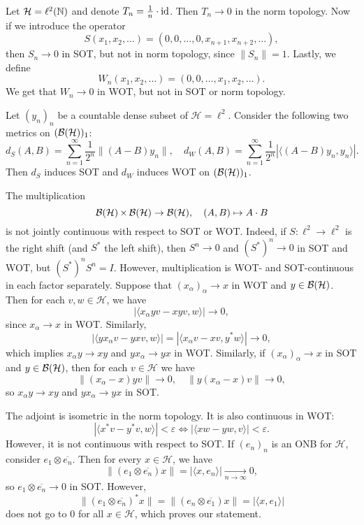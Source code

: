 \begin{example}
  Let $\mathcal{H} = \ell^2 (\mathbb {N})$ and denote $T_n = \frac{1}{n} \cdot \operatorname{id}$.
  Then $T_n \to 0$ in the norm topology. Now if we introduce the operator
  $$S (x_1, x_2, \dots) = (0, 0, \dots, 0, x_{n + 1}, x_{n + 2}, \dots),$$
  then $S_n \to 0$ in SOT, but not in norm topology, since $\|S_n\| = 1$.
  Lastly, we define 
  $$W_n (x_1, x_2, \dots) = (0, 0, \dots, x_1, x_2, \dots).$$
  We get that $W_n \to 0$ in WOT, but not in SOT or norm topology.
\end{example}

\begin{example}
  Let $(y_n)_n$ be a countable dense subset of $\mathcal{H} = \ell^2$.
  Consider the following two metrics on $(\operatorname{\mathcal{B} (\mathcal{H})})_1$:
  $$d_S (A, B) = \sum_{n = 1} ^\infty \frac{1}{2^n} \|(A - B) {y_n}\|,\quad d_W (A, B) = \sum_{n = 1} ^\infty \frac{1}{2^n} \left|\langle(A - B) {y_n} , y_n\rangle\right|.$$
  Then $d_S$ induces SOT and $d_W$ induces WOT on $(\operatorname{\mathcal{B} (\mathcal{H})})_1$.
\end{example}

\begin{example}
  The multiplication 
  $$\operatorname{\mathcal{B} (\mathcal{H})} \times \operatorname{\mathcal{B} (\mathcal{H})} \to \operatorname{\mathcal{B} (\mathcal{H})},\quad (A, B) \mapsto A \cdot B$$
  is not jointly continuous with respect to SOT or WOT. Indeed, if $S: \ell^2 \to \ell^2$ is the right shift (and $S^*$ the left shift),
  then $S^n \to 0$ and $(S^*)^n \to 0$ in SOT and WOT, but $(S^*)^n S^n = I$. However,
  multiplication is WOT- and SOT-continuous in each factor separately.
  Suppose that $(x_\alpha)_\alpha \to x$ in WOT and $y \in \operatorname{\mathcal{B} (\mathcal{H})}$.
  Then for each $v, w \in \mathcal{H}$, we have 
  $$|\langle x_\alpha yv - xyv, w \rangle | \to 0,$$
  since $x_\alpha \to x$ in WOT. Similarly,
  $$|\langle y x_\alpha v - yxv, w \rangle | = |\langle  x_\alpha v - xv, y^*w \rangle | \to 0,$$
  which implies $x_\alpha y \to xy$ and $y x_\alpha \to yx$ in WOT.
  Similarly, if $(x_\alpha)_\alpha \to x$ in SOT and $y \in \operatorname{\mathcal{B} (\mathcal{H})}$,
  then for each $v \in \mathcal{H}$ we have 
  $$\| (x_\alpha - x)yv\| \rightarrow 0,\quad \| y(x_\alpha - x)v\| \rightarrow 0,$$
  so $x_\alpha y \to xy$ and $y x_\alpha \to yx$ in SOT.
\end{example}

\begin{example}
  The adjoint is isometric in the norm topology. It is also continuous in WOT:
  $$|\langle x^* v - y^* v, w \rangle| < \varepsilon \Leftrightarrow |\langle xw - yw, v\rangle| < \varepsilon.$$
  However, it is not continuous with respect to SOT. If $(e_n)_n$ is an ONB for $\mathcal{H}$, consider $e_1 \otimes \overline{e_n}$.
  Then for every $x \in \mathcal{H}$, we have 
  $$\|(e_1 \otimes \overline{e_n}) x \| = |\langle x, e_n \rangle | \xrightarrow[n \to \infty]{} 0,$$
  so $e_1 \otimes \overline{e_n} \to 0$ in SOT. However,
  $$\| (e_1 \otimes \overline{e_n})^* x\| = \| (e_n \otimes \overline{e_1}) x\| = |\langle x, e_1 \rangle |$$
  does not go to $0$ for all $x \in \mathcal{H}$, which proves our statement.
\end{example}

